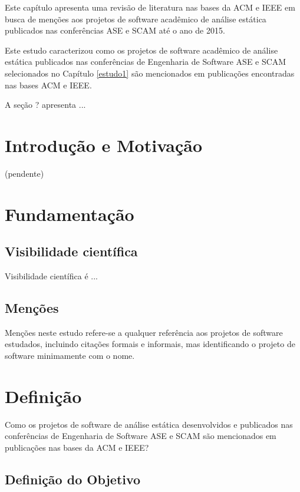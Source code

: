 {Este capítulo apresenta uma revisão de literatura nas bases da ACM e IEEE em
busca de menções aos projetos de software acadêmico de análise estática
publicados nas conferências ASE e SCAM até o ano de 2015.}

Este estudo caracterizou como os projetos de software acadêmico de análise
estática publicados nas conferências de Engenharia de Software ASE e SCAM
selecionados no Capítulo \ref{estudo1} são mencionados em publicações
encontradas nas bases ACM e IEEE.

A seção ? apresenta ...

\section{Introdução e Motivação}

(pendente)

\section{Fundamentação} \label{estudo2:fundamentacao} %

\subsection{Visibilidade científica}

Visibilidade científica é ...

\subsection{Menções}

Menções neste estudo refere-se a qualquer referência aos projetos de software
estudados, incluindo citações formais e informais, mas identificando o projeto
de software minimamente com o nome.


\section{Definição} \label{estudo2:definicao} %

Como os projetos de software de análise estática desenvolvidos e publicados nas
conferências de Engenharia de Software ASE e SCAM são mencionados em
publicações nas bases da ACM e IEEE?

\subsection{Definição do Objetivo}

